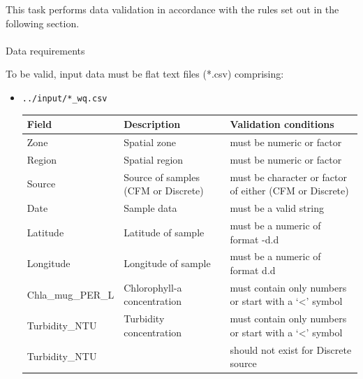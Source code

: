 \documentclass[
  8pt,
  a4paper]{article}
\makeatletter
\let\oldparagraph\paragraph
\renewcommand{\paragraph}{
    \@ifstar
      \xxxParagraphStar
      \xxxParagraphNoStar
  }
\newcommand{\xxxParagraphStar}[1]{\oldparagraph*{#1}\mbox{}}
\newcommand{\xxxParagraphNoStar}[1]{\oldparagraph{#1}\mbox{}}
\makeatother
\begin{document}
This task performs data validation in accordance with the rules set out
in the following section.

\paragraph{Data requirements}\label{sec-data-requirements}

To be valid, input data must be flat text files (*.csv) comprising:

\begin{itemize}
\item
  \texttt{../input/*\_wq.csv}

  \begin{longtable}[]{@{}
    >{\raggedright\arraybackslash}p{}
    >{\raggedright\arraybackslash}p{}
    >{\raggedright\arraybackslash}p{}@{}}
  \toprule\noalign{}
  \begin{minipage}[b]{\linewidth}\raggedright
  Field
  \end{minipage} & \begin{minipage}[b]{\linewidth}\raggedright
  Description
  \end{minipage} & \begin{minipage}[b]{\linewidth}\raggedright
  Validation conditions
  \end{minipage} \\
  \midrule\noalign{}
  \endhead
  \bottomrule\noalign{}
  \endlastfoot
  Zone & Spatial zone & must be numeric or factor \\
  Region & Spatial region & must be numeric or factor \\
  Source & Source of samples (CFM or Discrete) & must be character or
  factor of either (CFM or Discrete) \\
  Date & Sample data & must be a valid string \\
  Latitude & Latitude of sample & must be a numeric of format -d.d \\
  Longitude & Longitude of sample & must be a numeric of format d.d \\
  Chla\_mug\_PER\_L & Chlorophyll-a concentration & must contain only
  numbers or start with a `\textless{}' symbol \\
  Turbidity\_NTU & Turbidity concentration & must contain only numbers
  or start with a `\textless{}' symbol \\
  Turbidity\_NTU & & should not exist for Discrete source \\

\end{longtable}
\end{itemize}
\end{document}
